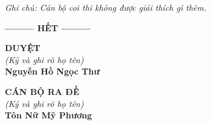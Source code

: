 \documentclass[12pt,a4paper]{article}
\begin{document}
\vspace{0.5cm}
\noindent
\textit{\small Ghi chú: Cán bộ coi thi không được giải thích gì thêm.}

\begin{center}
\textbf{--------- HẾT ---------}
\end{center}

\vspace{0.3cm}
\noindent
\begin{minipage}[t]{0.48\textwidth}
	\centering
	\textbf{DUYỆT}\\
	\textit{(Ký và ghi rõ họ tên)}\\[1.5cm]
	\textbf{Nguyễn Hồ Ngọc Thư}
\end{minipage}\hfill
\begin{minipage}[t]{0.48\textwidth}
	\centering
	\textbf{CÁN BỘ RA ĐỀ}\\
	\textit{(Ký và ghi rõ họ tên)}\\[1.5cm]
	\textbf{Tôn Nữ Mỹ Phương}
\end{minipage}
\end{document}
